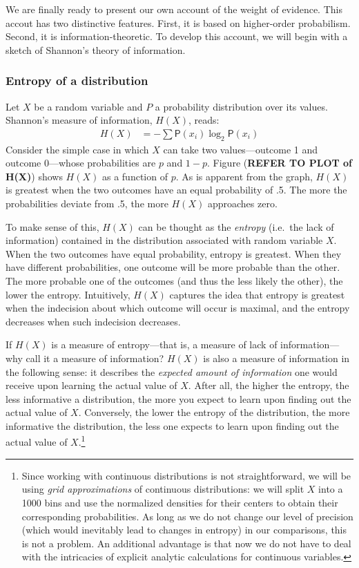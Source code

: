 \documentclass[
  10pt,
  dvipsnames,enabledeprecatedfontcommands]{scrartcl}
\begin{document}
We are finally ready to present our own account of the weight of
evidence. This accout has two distinctive features. First, it is based
on higher-order probabilism. Second, it is information-theoretic. To
develop this account, we will begin with a sketch of Shannon's theory of
information.

\hypertarget{entropy-of-a-distribution}{%
\subsubsection{Entropy of a
distribution}\label{entropy-of-a-distribution}}

Let \(X\) be a random variable and \(P\) a probability distribution over
its values. Shannon's measure of information, \(H(X)\), reads:
\begin{align*}
H(X)  & =
- \sum \mathsf{P}(x_i) \log_2 \mathsf{P}(x_i)
\end{align*} \noindent  Consider the simple case in which \(X\) can take
two values---outcome 1 and outcome 0---whose probabilities are \(p\) and
\(1-p\). Figure (\textbf{REFER TO PLOT of H(X)}) shows \(H(X)\) as a
function of \(p\). As is apparent from the graph, \(H(X)\) is greatest
when the two outcomes have an equal probability of .5. The more the
probabilities deviate from .5, the more \(H(X)\) approaches zero.

To make sense of this, \(H(X)\) can be thought as the \textit{entropy}
(i.e.~the lack of information) contained in the distribution associated
with random variable \(X\). When the two outcomes have equal
probability, entropy is greatest. When they have different
probabilities, one outcome will be more probable than the other. The
more probable one of the outcomes (and thus the less likely the other),
the lower the entropy. Intuitively, \(H(X)\) captures the idea that
entropy is greatest when the indecision about which outcome will occur
is maximal, and the entropy decreases when such indecision decreases.

If \(H(X)\) is a measure of entropy---that is, a measure of lack of
information---why call it a measure of information? \(H(X)\) is also a
measure of information in the following sense: it describes the
\textit{expected amount of information} one would receive upon learning
the actual value of \(X\). After all, the higher the entropy, the less
informative a distribution, the more you expect to learn upon finding
out the actual value of \(X\). Conversely, the lower the entropy of the
distribution, the more informative the distribution, the less one
expects to learn upon finding out the actual value of \(X\).\footnote{Since
  working with continuous distributions is not straightforward, we will
  be using \emph{grid approximations} of continuous distributions: we
  will split \(X\) into a 1000 bins and use the normalized densities for
  their centers to obtain their corresponding probabilities. As long as
  we do not change our level of precision (which would inevitably lead
  to changes in entropy) in our comparisons, this is not a problem. An
  additional advantage is that now we do not have to deal with the
  intricacies of explicit analytic calculations for continuous
  variables.}
\end{document}
